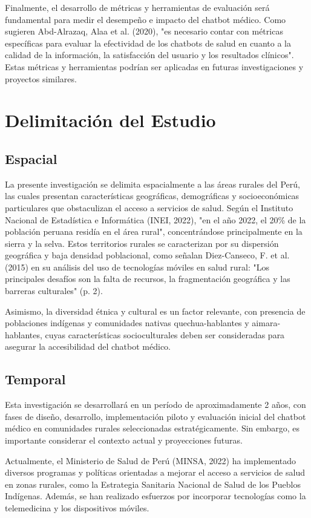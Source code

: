 Finalmente, el desarrollo de métricas y herramientas de evaluación será fundamental para medir el desempeño e impacto del chatbot médico. Como sugieren Abd-Alrazaq, Alaa et al. (2020), "es necesario contar con métricas específicas para evaluar la efectividad de los chatbots de salud en cuanto a la calidad de la información, la satisfacción del usuario y los resultados clínicos". Estas métricas y herramientas podrían ser aplicadas en futuras investigaciones y proyectos similares.

\section{Delimitación del Estudio}

\subsection{Espacial}
La presente investigación se delimita espacialmente a las áreas rurales del Perú, las cuales presentan características geográficas, demográficas y socioeconómicas particulares que obstaculizan el acceso a servicios de salud. Según el Instituto Nacional de Estadística e Informática (INEI, 2022), "en el año 2022, el 20\% de la población peruana residía en el área rural", concentrándose principalmente en la sierra y la selva. Estos territorios rurales se caracterizan por su dispersión geográfica y baja densidad poblacional, como señalan Diez-Canseco, F. et al. (2015) en su análisis del uso de tecnologías móviles en salud rural: "Los principales desafíos son la falta de recursos, la fragmentación geográfica y las barreras culturales" (p. 2).

Asimismo, la diversidad étnica y cultural es un factor relevante, con presencia de poblaciones indígenas y comunidades nativas quechua-hablantes y aimara-hablantes, cuyas características socioculturales deben ser consideradas para asegurar la accesibilidad del chatbot médico.

\subsection{Temporal}
Esta investigación se desarrollará en un período de aproximadamente 2 años, con fases de diseño, desarrollo, implementación piloto y evaluación inicial del chatbot médico en comunidades rurales seleccionadas estratégicamente. Sin embargo, es importante considerar el contexto actual y proyecciones futuras.

Actualmente, el Ministerio de Salud de Perú (MINSA, 2022) ha implementado diversos programas y políticas orientadas a mejorar el acceso a servicios de salud en zonas rurales, como la Estrategia Sanitaria Nacional de Salud de los Pueblos Indígenas. Además, se han realizado esfuerzos por incorporar tecnologías como la telemedicina y los dispositivos móviles.

